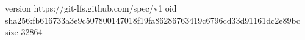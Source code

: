 version https://git-lfs.github.com/spec/v1
oid sha256:fb616733a3e9c507800147018f19fa86286763419c6796cd33d91161dc2e89bc
size 32864
